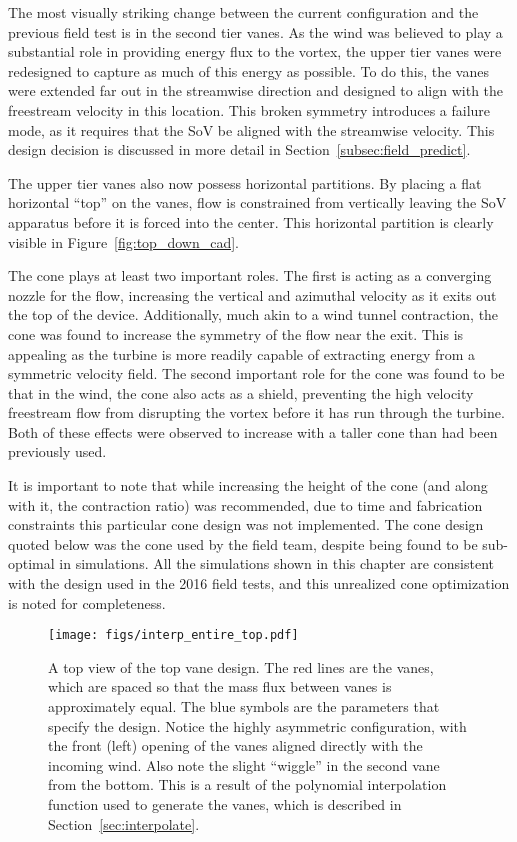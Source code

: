 The most visually striking change between the current configuration and
the previous field test is in the second tier vanes. As the wind was
believed to play a substantial role in providing energy flux to the
vortex, the upper tier vanes were redesigned to capture as much of this
energy as possible. To do this, the vanes were extended far out in the
streamwise direction and designed to align with the freestream velocity
in this location. This broken symmetry introduces a failure mode, as it
requires that the SoV be aligned with the streamwise velocity. This
design decision is discussed in more detail in
Section~\ref{subsec:field_predict}. 

The upper tier vanes also now possess horizontal partitions. By placing
a flat horizontal ``top'' on the vanes, flow is constrained from
vertically leaving the SoV apparatus before it is forced into the
center. This horizontal partition is clearly visible in
Figure~\ref{fig:top_down_cad}.   

The cone plays at least two important roles. The first is acting as a
converging nozzle for the flow, increasing the vertical and azimuthal
velocity as it exits out the top of the device. Additionally, much akin
to a wind tunnel contraction, the cone was found to increase the
symmetry of the flow near the exit. This is appealing as the turbine is
more readily capable of extracting energy from a symmetric velocity
field. The second important role for the cone was found to be that in
the wind, the cone also acts as a shield, preventing the high velocity
freestream flow from disrupting the vortex before it has run through the
turbine. Both of these effects were observed to increase with a taller
cone than had been previously used.

It is important to note that while increasing the height of the cone
(and along with it, the contraction ratio) was recommended, due to
time and fabrication constraints this particular cone design was not
implemented. The cone design quoted below was the cone used by
the field team, despite being found to be sub-optimal in
simulations. All the simulations shown in this chapter are consistent
with the design used in the 2016 field tests, and this unrealized cone
optimization is noted for completeness.

 \begin{figure}[!htb]
  \begin{center}
   \texttt{[image: figs/interp\_entire\_top.pdf]}
   \caption{A top view of the top vane design. The red lines are the
     vanes, which are spaced so that the mass flux between vanes is
     approximately equal. The blue symbols are the parameters that
     specify the design. Notice the highly asymmetric configuration,
     with the front (left) opening of the vanes aligned directly with
     the incoming wind. Also note the slight ``wiggle'' in the second
   vane from the bottom. This is a result of the polynomial
   interpolation function used to generate the vanes, which is described
   in Section~\ref{sec:interpolate}.} 
   \label{fig:top_design}
  \end{center}
 \end{figure}

